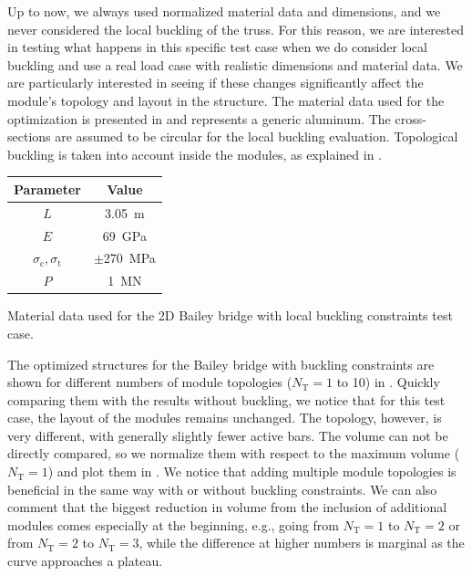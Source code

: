 Up to now, we always used normalized material data and dimensions, and we never considered the local buckling of the truss. For this reason, we are interested in testing what happens in this specific test case when we do consider local buckling and use a real load case with realistic dimensions and material data. We are particularly interested in seeing if these changes significantly affect the module's topology and layout in the structure. The material data used for the optimization is presented in  and represents a generic aluminum. The cross-sections are assumed to be circular for the local buckling evaluation. Topological buckling is taken into account inside the modules, as explained in .

\begin{margintable}
    \small
    \centering
    \begin{tabular}{cc}
    \toprule
    \textbf{Parameter}        & \textbf{Value} \\ \midrule
    $L$              & \qty{3.05}{m}     \\
    $E$              & \qty{69}{GPa}     \\
    $\sigma_\text{c}, \sigma_\text{t}$ & $\pm $\qty{270}{MPa} \\
    $P$              & \qty{1}{MN}   \\
    \bottomrule
    \end{tabular}
    \caption{Material data used for the 2D Bailey bridge with local buckling constraints test case.}
    \label{tab:06_modular_tug_buck}
\end{margintable}

The optimized structures for the Bailey bridge with buckling constraints are shown for different numbers of module topologies ($N_\text{T}=1$ to 10) in . Quickly comparing them with the results without buckling, we notice that for this test case, the layout of the modules remains unchanged. The topology, however, is very different, with generally slightly fewer active bars. The volume can not be directly compared, so we normalize them with respect to the maximum volume ($N_\text{T}=1$) and plot them in . We notice that adding multiple module topologies is beneficial in the same way with or without buckling constraints. We can also comment that the biggest reduction in volume from the inclusion of additional modules comes especially at the beginning, e.g., going from $N_\text{T}=1$ to $N_\text{T}=2$ or from $N_\text{T}=2$ to $N_\text{T}=3$, while the difference at higher numbers is marginal as the curve approaches a plateau.

